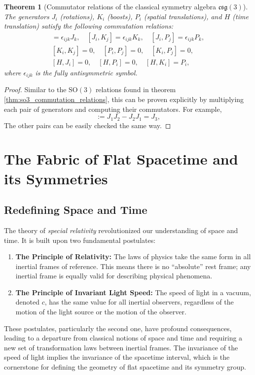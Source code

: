 \documentclass{amsart}
\newtheorem{theorem}{Theorem}[section]
\theoremstyle{definition}
\theoremstyle{remark}
\begin{document}
\begin{theorem}[Commutator relations of the classical symmetry algebra $\mathfrak{csg}(3)$]\label{thm:csg3_commutation_relations}
  The generators \(J_i\) (rotations), \(K_i\) (boosts), \(P_i\) (spatial translations), and \(H\) (time translation) satisfy the following commutation relations:
  \begin{gather*}
    [J_i, J_j] = \epsilon_{ijk} J_k, \quad
    [J_i, K_j] = \epsilon_{ijk} K_k, \quad
    [J_i, P_j] = \epsilon_{ijk} P_k, \\
    [K_i, K_j] = 0, \quad
    [P_i, P_j] = 0, \quad
    [K_i, P_j] = 0, \\
    [H, J_i] = 0, \quad
    [H, P_i] = 0, \quad
    [H, K_i] = P_i,
  \end{gather*}
  where $\epsilon_{ijk}$ is the fully antisymmetric symbol.
\end{theorem}
\begin{proof}
  Similar to the $\mathrm{SO}(3)$ relations found in theorem \ref{thm:so3_commutation_relations}, this can be proven explicitly by multiplying each pair of generators and computing their commutators.
  For example,
  \begin{equation*}
    [J_1, J_2] := J_1 J_2 - J_2 J_1 = J_3,
  \end{equation*}
  The other pairs can be easily checked the same way.
\end{proof}

\section{The Fabric of Flat Spacetime and its Symmetries}
\label{sec:sr}

\subsection{Redefining Space and Time}
\label{subsec:sr_postulates}
The theory of \emph{special relativity} revolutionized our understanding of space and time.
It is built upon two fundamental postulates:

\begin{enumerate}
  \item \textbf{The Principle of Relativity:} The laws of physics take the same form in all inertial frames of reference.
  This means there is no ``absolute'' rest frame; any inertial frame is equally valid for describing physical phenomena.
  \item \textbf{The Principle of Invariant Light Speed:} The speed of light in a vacuum, denoted $c$, has the same value for all inertial observers, regardless of the motion of the light source or the motion of the observer.
\end{enumerate}
These postulates, particularly the second one, have profound consequences, leading to a departure from classical notions of space and time and requiring a new set of transformation laws between inertial frames.
The invariance of the speed of light implies the invariance of the spacetime interval, which is the cornerstone for defining the geometry of flat spacetime and its symmetry group.
\end{document}

